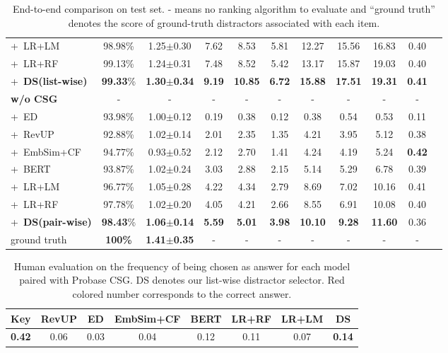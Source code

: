 \begin{table}[t!]
\begin{tabular}{lc cc c c c c c cc}
			+~LR+LM &98.98\%  &1.25$\pm$0.30   &7.62  &8.53  &5.81 &12.27 &15.56 &16.83 &0.40 \\
			+~LR+RF &99.13\%  &1.24$\pm$0.31   &7.48 &8.52 &5.42 &13.17   &15.87 &19.03 &0.40\\
			+~\textbf{DS(list-wise)} &\textbf{99.33}\%  &\textbf{1.30$\pm$0.34} &\textbf{9.19}  &\textbf{10.85} &\textbf{6.72} &\textbf{15.88} &\textbf{17.51} &\textbf{19.31} &\textbf{0.41} \\
			\midrule
			\textbf{w/o CSG} &- &- &- &- &- &-  &- &- &- \\
			+~ED &93.98\%  &1.00$\pm$0.12  &0.19 &0.38  &0.12  &0.38  &0.54  &0.53  &0.11 \\
			+~RevUP &92.88\%  &1.02$\pm$0.14  &2.01 &2.35  &1.35  &4.21  &3.95  &5.12  &0.38 \\
			+~EmbSim+CF &94.77\%  &0.93$\pm$0.52  &2.12 &2.70  &1.41  &4.24  &4.19  &5.24  &\textbf{0.42} \\
			+~BERT &93.87\% &1.02$\pm$0.24  &3.03 &2.88  &2.15  &5.14  &5.29  &6.78  &0.39 \\
			+~LR+LM &96.77\%  &1.05$\pm$0.28   &4.22  &4.34  &2.79 &8.69 &7.02 &10.16 &0.41 \\
			+~LR+RF &97.78\%  &1.02$\pm$0.20   &4.05  &4.21 &2.66 &8.55 &6.91 &10.08 &0.40\\
			+~\textbf{DS(pair-wise)} &\textbf{98.43}\%  &\textbf{1.06$\pm$0.14} &\textbf{5.59} &\textbf{5.01} &\textbf{3.98} &\textbf{10.10}  &\textbf{9.28} &\textbf{11.60} &0.36\\
			\midrule
			ground truth &\textbf{100\%}  &\textbf{1.41$\pm$0.35}  & - & - & - & - & - & - & -\\
			\bottomrule
		\end{tabular}
		\caption{End-to-end comparison on test set. - means no ranking algorithm to evaluate and ``ground truth'' denotes the score of ground-truth distractors associated with each item.}
		\label{table:human}
	\end{table}
	\begin{table}[t!]%
		\small
		\centering
			\begin{tabular}{cccccccc} %
				\toprule
				 \textbf{Key} &RevUP &ED  & EmbSim+CF &BERT & LR+RF & LR+LM & \textbf{DS}\\
				\midrule
				  \color{red} \textbf{0.42} &0.06  &0.03  &0.04 &0.12  &0.11 &0.07   &\textbf{0.14}\\
				\midrule
			\end{tabular}
			\caption{Human evaluation on the frequency of being chosen as answer for each model paired with Probase CSG. DS denotes our list-wise distractor selector. Red colored number corresponds to the correct answer.} 
			\label{table:app}
		\end{table}
\noindent

